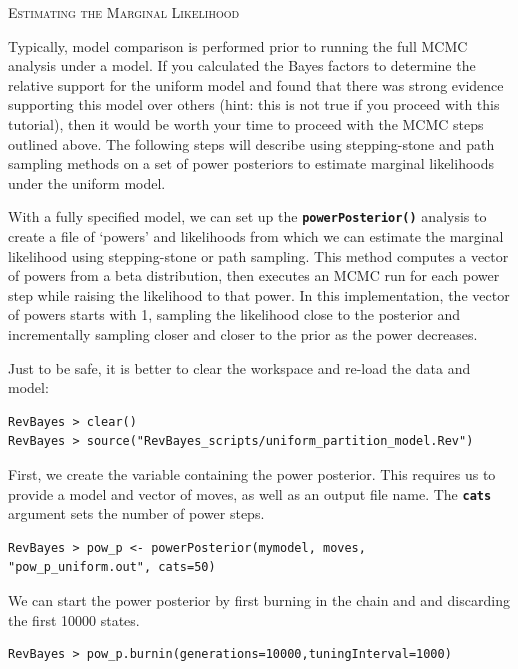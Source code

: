 \documentclass[11pt]{article}
\newcommand{\cl}[1]{{\texttt{\textbf{#1}}}}
\begin{document}
\bigskip
{\large \textcolor{mycol}{\textsc{Estimating the Marginal Likelihood}}}

Typically, model comparison is performed prior to running the full MCMC analysis under a model. 
If you calculated the Bayes factors to determine the relative support for the uniform model and found that there was strong evidence supporting this model over others (hint: this is not true if you proceed with this tutorial), then it would be worth your time to proceed with the MCMC steps outlined above. 
The following steps will describe using stepping-stone and path sampling methods on a set of power posteriors to estimate marginal likelihoods under the uniform model. 

With a fully specified model, we can set up the \cl{powerPosterior()} analysis to create a file of `powers' and likelihoods from which we can estimate the marginal likelihood using stepping-stone or path sampling. 
This method computes a vector of powers from a beta distribution, then executes an MCMC run for each power step while raising the likelihood to that power. In this implementation, the vector of powers starts with 1, sampling the likelihood close to the posterior and incrementally sampling closer and closer to the prior as the power decreases. 




Just to be safe, it is better to clear the workspace and re-load the data and model:
{\tt \begin{snugshade*}
\begin{lstlisting}
RevBayes > clear()
RevBayes > source("RevBayes_scripts/uniform_partition_model.Rev")
\end{lstlisting}
\end{snugshade*}}


First, we create the variable containing the power posterior. 
This requires us to provide a model and vector of moves, as well as an output file name. 
The \cl{cats} argument sets the number of power steps.
{\tt \begin{snugshade*}
\begin{lstlisting}
RevBayes > pow_p <- powerPosterior(mymodel, moves, "pow_p_uniform.out", cats=50) 
\end{lstlisting}
\end{snugshade*}}

We can start the power posterior by first burning in the chain and and discarding the first 10000 states.  
{\tt \begin{snugshade*}
\begin{lstlisting}
RevBayes > pow_p.burnin(generations=10000,tuningInterval=1000)
\end{lstlisting}
\end{snugshade*}}
\end{document}
